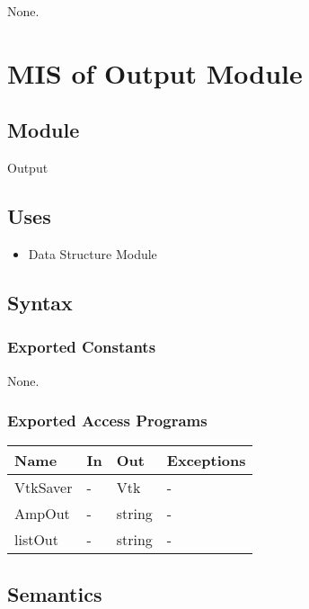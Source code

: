 \documentclass[12pt, titlepage]{article}
\begin{document}
None.

\newpage
%
%
%
%
\section{MIS of Output Module} \label{MPM} 



\subsection{Module}
Output

\subsection{Uses}
\begin{itemize}
	\item Data Structure Module
\end{itemize}

\subsection{Syntax}

\subsubsection{Exported Constants}
None.
\subsubsection{Exported Access Programs}

\begin{center}
	\begin{tabular}{p{2cm} p{4cm} p{4cm} p{2cm}}
		\hline
		\textbf{Name} & \textbf{In} & \textbf{Out} & \textbf{Exceptions} \\
		\hline
		VtkSaver & - & Vtk & - \\
		AmpOut & - & string & - \\
		listOut & - & string & - \\
		
		\hline
	\end{tabular}
\end{center}

\subsection{Semantics}
\end{document}
